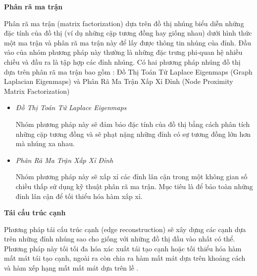 \textbf{Phân rã ma trận}

Phân rã ma trận (matrix factorization) dựa trên đồ thị nhúng biểu diễn những đặc tính của đồ thị (ví dụ những cặp tương đồng hay giống nhau) dưới hình thức một ma trận và phân rã ma trận này để lấy được thông tin nhúng của đỉnh. Đầu vào của nhóm phương pháp này thường là những đặc trưng phi-quan hệ nhiều chiều và đầu ra là tập hợp các đỉnh nhúng. Có hai phương pháp nhúng đồ thị dựa trên phân rã ma trận bao gồm : Đồ Thị Toán Tử Laplace Eigenmaps (Graph Laplacian Eigenmaps) và Phân Rã Ma Trận Xấp Xỉ Đỉnh (Node Proximity Matrix Factorization)

\begin{itemize}
	\item \textit{Đồ Thị Toán Tử Laplace Eigenmaps}
	
	Nhóm phương pháp này sẽ đảm bảo đặc tính của đồ thị bằng cách phân tích những cặp tương đồng và sẽ phạt nặng những đỉnh có sự tương đồng lớn hơn mà nhúng xa nhau. 
	
	\item \textit{Phân Rã Ma Trận Xấp Xỉ Đỉnh}
	
	Nhóm phương pháp này sẽ xấp xỉ các đỉnh lân cận trong một không gian số chiều thấp sử dụng kỹ thuật phân rã ma trận. Mục tiêu là để bảo toàn những đỉnh lân cận để tối thiểu hóa hàm xấp xỉ.
\end{itemize}

\textbf{Tái cấu trúc cạnh}

Phương pháp tái cấu trúc cạnh (edge reconstruction) sẽ xây dựng các cạnh dựa trên những đỉnh nhúng sao cho giống với những đồ thị đầu vào nhất có thể. Phương pháp này tối tối đa hóa xác xuất tái tạo cạnh hoặc tối thiểu hóa hàm mất mát tái tạo cạnh, ngoài ra còn chia ra hàm mất mát dựa trên khoảng cách và hàm xếp hạng mất mất mát dựa trên lề .


